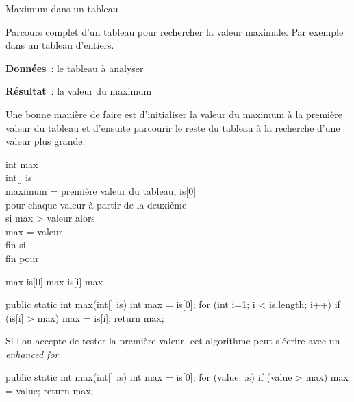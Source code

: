 \begin{Fiche}{Maximum dans un tableau}
\label{fiche:tab-max}

	Parcours complet d'un tableau pour rechercher la valeur maximale.
	Par exemple dans un tableau d'entiers. 

	
	\textbf{Données}~: le tableau à analyser

	\textbf{Résultat}~: la valeur du maximum


	Une bonne manière de faire est d'initialiser la valeur du maximum à la
	première valeur du tableau et d'ensuite parcourir le reste du tableau à la
	recherche d'une valeur plus grande. 

	\begin{langagenaturel}
		int max\\
		int[] is \\
		maximum = première valeur du tableau, is[0]\\
		pour chaque valeur à partir de la deuxième\\
		\tab si max > valeur alors\\
		\tab\tab max = valeur\\
		\tab fin si\\ 
		fin pour\\
	\end{langagenaturel}

	
	\begin{pseudocode}
			\Let max \Gets is[0]
					\Let max \Gets is[i]
				\EndIf
			\EndFor
			\Return max
		\EndAlgo
	\end{pseudocode}

	\begin{java}
public static int max(int[] is){
	int max = is[0];
	for (int i=1; i < is.length; i++){
		if (is[i] > max){
			max = is[i];
		}
	}
	return max;
}
	\end{java}

	Si l'on accepte de tester la première valeur, cet algorithme peut s'écrire
	avec un \textit{enhanced for}.

	\begin{java}
public static int max(int[] is){
	int max = is[0];
	for (value: is){
		if (value > max){
			max = value;
		}
	}
	return max,
}
	\end{java}


\end{Fiche}
